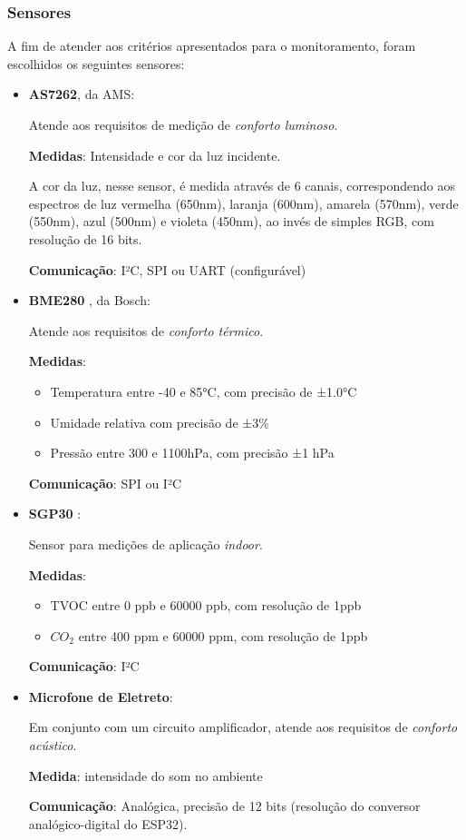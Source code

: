 \documentclass[../monografia.tex]{subfiles}
\begin{document}
\subsubsection{Sensores}
A fim de atender aos critérios apresentados para o monitoramento, foram escolhidos os seguintes sensores: 
\begin{itemize}
\item \textbf{AS7262}\cite{as7262}, da AMS: 

Atende aos requisitos de medição de \textit{conforto luminoso}. 

\textbf{Medidas}: Intensidade e cor da luz incidente.

A cor da luz, nesse sensor, é medida através de 6 canais, correspondendo aos espectros de luz vermelha (650nm), laranja (600nm), amarela (570nm), verde (550nm), azul (500nm) e violeta (450nm), ao invés de simples RGB, com resolução de 16 bits.

\textbf{Comunicação}: I²C, SPI ou UART (configurável)

\item \textbf{BME280} \cite{bme280}, da Bosch: 

Atende aos requisitos de \textit{conforto térmico}. 

\textbf{Medidas}: 
    \begin{itemize}
    \item Temperatura entre -40 e 85°C, com precisão de ±1.0°C
    \item Umidade relativa com precisão de ±3\%
    \item Pressão entre 300 e 1100hPa, com precisão ±1 hPa
    \end{itemize}

\textbf{Comunicação}: SPI ou I²C

\item \textbf{SGP30} \cite{sgp30}:

Sensor para medições de aplicação \textit{indoor}. 

\textbf{Medidas}:
    \begin{itemize}
    \item TVOC entre 0 ppb e 60000 ppb, com resolução de 1ppb
    \item $CO_{2}$ entre 400 ppm e 60000 ppm, com resolução de 1ppb
    \end{itemize}

\textbf{Comunicação}: I²C

\item \textbf{Microfone de Eletreto}:

Em conjunto com um circuito amplificador, atende aos requisitos de \textit{conforto acústico}. 

\textbf{Medida}: intensidade do som no ambiente

\textbf{Comunicação}: Analógica, precisão de 12 bits (resolução do conversor analógico-digital do ESP32). 
\end{itemize}
\end{document}
